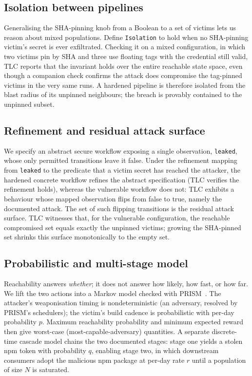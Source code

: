 \documentclass[letterpaper,twocolumn,10pt]{article}
\newcommand{\code}[1]{\texttt{\small #1}}
\begin{document}
\subsection{Isolation between pipelines}
Generalising the SHA-pinning knob from a Boolean to a set of victims lets us reason about mixed populations. Define \code{Isolation} to hold when no SHA-pinning victim's secret is ever exfiltrated. Checking it on a mixed configuration, in which two victims pin by SHA and three use floating tags with the credential still valid, TLC reports that the invariant holds over the entire reachable state space, even though a companion check confirms the attack does compromise the tag-pinned victims in the very same runs. A hardened pipeline is therefore isolated from the blast radius of its unpinned neighbours; the breach is provably contained to the unpinned subset.

\subsection{Refinement and residual attack surface}
We specify an abstract secure workflow exposing a single observation, \code{leaked}, whose only permitted transitions leave it false. Under the refinement mapping from \code{leaked} to the predicate that a victim secret has reached the attacker, the hardened concrete workflow refines the abstract specification (TLC verifies the refinement holds), whereas the vulnerable workflow does not: TLC exhibits a behaviour whose mapped observation flips from false to true, namely the documented attack. The set of such flipping transitions is the residual attack surface. TLC witnesses that, for the vulnerable configuration, the reachable compromised set equals exactly the unpinned victims; growing the SHA-pinned set shrinks this surface monotonically to the empty set.

\subsection{Probabilistic and multi-stage model}
Reachability answers \emph{whether}; it does not answer how likely, how fast, or how far. We lift the two actions into a Markov model checked with PRISM~\cite{prism}. The attacker's weaponisation timing is nondeterministic (an adversary, resolved by PRISM's schedulers); the victim's build cadence is probabilistic with per-day probability $p$. Maximum reachability probability and minimum expected reward then give worst-case (most-capable-adversary) quantities. A separate discrete-time cascade model chains the two documented stages: stage one yields a stolen npm token with probability $q$, enabling stage two, in which downstream consumers adopt the malicious npm package at per-day rate $r$ until a population of size $N$ is saturated.
\end{document}
